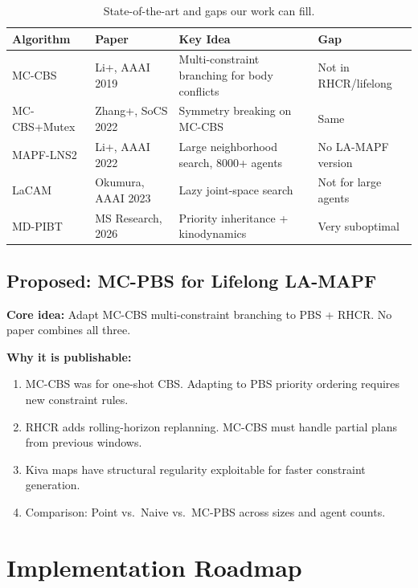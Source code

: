 \documentclass[12pt, a4paper]{article}
\begin{document}
\begin{table}[H]
\centering
\small
\begin{tabular}{@{}llp{5cm}p{4cm}@{}}
\toprule
\textbf{Algorithm} & \textbf{Paper} & \textbf{Key Idea} & \textbf{Gap} \\
\midrule
MC-CBS & Li+, AAAI 2019 & Multi-constraint branching for body conflicts & Not in RHCR/lifelong \\
MC-CBS+Mutex & Zhang+, SoCS 2022 & Symmetry breaking on MC-CBS & Same \\
MAPF-LNS2 & Li+, AAAI 2022 & Large neighborhood search, 8000+ agents & No LA-MAPF version \\
LaCAM & Okumura, AAAI 2023 & Lazy joint-space search & Not for large agents \\
MD-PIBT & MS Research, 2026 & Priority inheritance + kinodynamics & Very suboptimal \\
\bottomrule
\end{tabular}
\caption{State-of-the-art and gaps our work can fill.}
\end{table}

\subsection{Proposed: MC-PBS for Lifelong LA-MAPF}

\textbf{Core idea:} Adapt MC-CBS multi-constraint branching to PBS + RHCR. No paper combines all three.

\textbf{Why it is publishable:}
\begin{enumerate}
    \item MC-CBS was for one-shot CBS. Adapting to PBS priority ordering requires new constraint rules.
    \item RHCR adds rolling-horizon replanning. MC-CBS must handle partial plans from previous windows.
    \item Kiva maps have structural regularity exploitable for faster constraint generation.
    \item Comparison: Point vs.\ Naive vs.\ MC-PBS across sizes and agent counts.
\end{enumerate}

\section{Implementation Roadmap}
\end{document}
